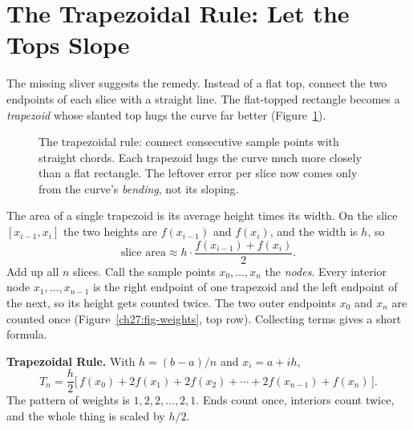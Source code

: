 \section{The Trapezoidal Rule: Let the Tops Slope}
\label{ch27:trap}

The missing sliver suggests the remedy. Instead of a flat top, connect the two endpoints of each slice with a straight line. The flat-topped rectangle becomes a \emph{trapezoid} whose slanted top hugs the curve far better (Figure~\ref{ch27:fig-trap}).

\begin{figure}[htbp]
\centering
{}
\caption{The trapezoidal rule: connect consecutive sample points with straight chords. Each trapezoid hugs the curve much more closely than a flat rectangle. The leftover error per slice now comes only from the curve's \emph{bending}, not its sloping.}
\label{ch27:fig-trap}
\end{figure}

The area of a single trapezoid is its average height times its width. On the slice $[x_{i-1}, x_i]$ the two heights are $f(x_{i-1})$ and $f(x_i)$, and the width is $h$, so
\[
\text{slice area} \approx h\cdot \frac{f(x_{i-1}) + f(x_i)}{2}.
\]
Add up all $n$ slices. Call the sample points $x_0, \dots, x_n$ the \emph{nodes}. Every interior node $x_1, \dots, x_{n-1}$ is the right endpoint of one trapezoid and the left endpoint of the next, so its height gets counted twice. The two outer endpoints $x_0$ and $x_n$ are counted once (Figure~\ref{ch27:fig-weights}, top row). Collecting terms gives a short formula.

\begin{focusbox}
\textbf{Trapezoidal Rule.} With $h = (b-a)/n$ and $x_i = a + i h$,
\[
T_n = \frac{h}{2}\Big[\, f(x_0) + 2f(x_1) + 2f(x_2) + \cdots + 2f(x_{n-1}) + f(x_n) \,\Big].
\]
The pattern of weights is $1,2,2,\dots,2,1$. Ends count once, interiors count twice, and the whole thing is scaled by $h/2$.
\end{focusbox}

